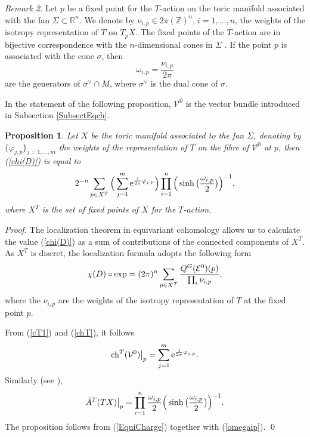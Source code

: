 \documentclass[xypic,amscd,syntonly,amssymb,verbatim,12pt]{amsart}
\theoremstyle{plain}
\newtheorem{Prop}[Thm]{Proposition}
\theoremstyle{definition}
\theoremstyle{remark}
\numberwithin{equation}{section}
\begin{document}
{\it Remark 2.}
 Let $p$ be a fixed point for the $T$-action on the toric manifold associated with the fan $\Sigma\subset{\mathbb R}^n$.
 We denote by $\nu_{i,p}\in 2\pi({\mathbb Z})^n$,$\;i=1,\dots,n$,  the weights of the isotropy representation
 of $T$ on $T_pX$. The fixed points of the $T$-action are in bijective correspondence
with the $n$-dimensional cones in $\Sigma$ \cite[]{C-L-S}. If the point $p$ is associated with the cone
$\sigma$, then
  \begin{equation}\label{omegaip}
  \omega_{i,p}=\frac{\nu_{i,p}}{2\pi}
  \end{equation}
  are the generators of $\sigma^{\vee}\cap M$, where $\sigma^{\vee}$ is the dual cone of $\sigma$.

\smallskip

 In the statement of the following proposition, ${\mathcal V}^0$ is
 the vector bundle introduced in Subsection \ref{SubsectEqch}.
\begin{Prop}\label{PropFixedPoint}
Let $X$ be the toric manifold associated to the fan $\Sigma$, denoting by $\{\varphi_{j,p}\}_{j=1,\dots,m}$ the weights of the representation of $T$ on the fibre of ${\mathcal V}^0$ at $p$, then  (\ref{chi(D)}) is equal to
\begin{equation}\label{2-n}
 2^{-n}\sum_{p\in X^T}\Big(\sum_{j=1}^m{\rm
e}^{\frac{1}{2\pi}\varphi_{j,p}}
\Big)\prod_{i=1}^n\Big(\sinh\big(\frac{
\omega_{i,p}}{2}\big)\Big)^{-1},
 \end{equation}
 where $X^T$ is the set of fixed points of $X$ for the $T$-action.
\end{Prop}
{\it Proof.} 
The localization theorem  in equivariant cohomology
\cite[]{G-S} allows us to calculate the value
(\ref{chi(D)}) as a sum of contributions of the connected
components of $X^T$. As $X^T$ is discret, the localization formula
adopts the following form
\begin{equation}\label{chi(D)1}
 \chi(D)\circ{\rm exp}=(2\pi)^n\sum_{p\in X^T}\frac{Q^G({\mathcal E}^0)(p)}{\prod_i\nu_{i,p}},
 \end{equation}
where the $\nu_{i,p}$ are the weights of the isotropy representation of $T$ at the fixed point $p$.

From (\ref{cT1}) and (\ref{chT}), it follows
$${\rm ch}^T({\mathcal V}^0){\big|_p}=\sum_{j=1}^m{\rm e}^{\frac{1}{2\pi}\varphi_{j,p}}.$$
Similarly (see \cite[page 231]{L-M}),
$$\Hat A^T(TX){\big|_p}=\prod_{i=1}^n\frac{\omega_{i,p}}{2}\Big(\sinh\big(\frac{\omega_{i,p}}{2}\big)\Big)^{-1}.$$
The proposition follows from (\ref{EquiCharge}) together with
(\ref{omegaip}). \qed
\end{document}
